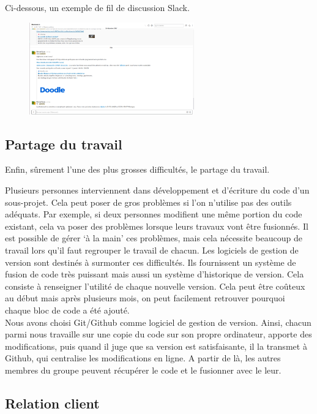 \documentclass[a4paper]{article}
\begin{document}
\newpage
Ci-dessous, un exemple de fil de discussion Slack.
\begin{figure}[!h]
\centering
	\includegraphics[keepaspectratio, height=150px]{./tmp/ChatSlack.png}
\end{figure}

\subsection{Partage du travail}

Enfin, sûrement l’une des plus grosses difficultés, le partage du travail.


Plusieurs personnes interviennent dans développement et d’écriture du code d’un sous-projet.
Cela peut poser de gros problèmes si l’on n’utilise pas des outils adéquats. Par exemple, si deux
personnes modifient une même portion du code existant, cela va poser des problèmes lorsque
leurs travaux vont être fusionnés. Il est possible de gérer ‘à la main’ ces problèmes, mais cela
nécessite beaucoup de travail lors qu’il faut regrouper le travail de chacun. Les logiciels de gestion
de version sont destinés à surmonter ces difficultés. Ils fournissent un système de fusion de code
très puissant mais aussi un système d’historique de version. Cela consiste à renseigner l’utilité de
chaque nouvelle version. Cela peut être coûteux au début mais après plusieurs mois, on peut
facilement retrouver pourquoi chaque bloc de code a été ajouté.
\\

Nous avons choisi Git/Github comme logiciel de gestion de version. Ainsi, chacun parmi nous
travaille sur une copie du code sur son propre ordinateur, apporte des modifications, puis quand
il juge que sa version est satisfaisante, il la transmet à Github, qui centralise les modifications en
ligne. A partir de là, les autres membres du groupe peuvent récupérer le code et le fusionner avec
le leur.

\subsection{Relation client}
\end{document}
